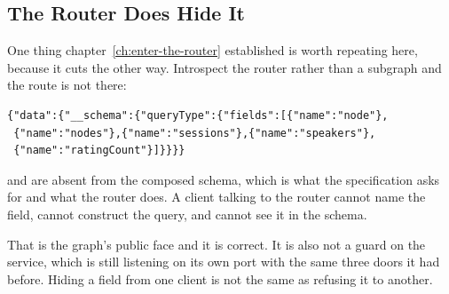 \subsection{The Router Does Hide It}

%
One thing chapter~\ref{ch:enter-the-router} established is worth repeating
here, because it cuts the other way. Introspect the router rather than a
subgraph and the route is not there:

\begin{verbatim}
{"data":{"__schema":{"queryType":{"fields":[{"name":"node"},
 {"name":"nodes"},{"name":"sessions"},{"name":"speakers"},
 {"name":"ratingCount"}]}}}}
\end{verbatim}

%
 and  are absent from the composed schema,
which is what the specification asks for and what the router does. A client
talking to the router cannot name the field, cannot construct the query, and
cannot see it in the schema.

That is the graph's public face and it is correct. It is also not a guard on
the service, which is still listening on its own port with the same three
doors it had before. Hiding a field from one client is not the same as
refusing it to another.
%
